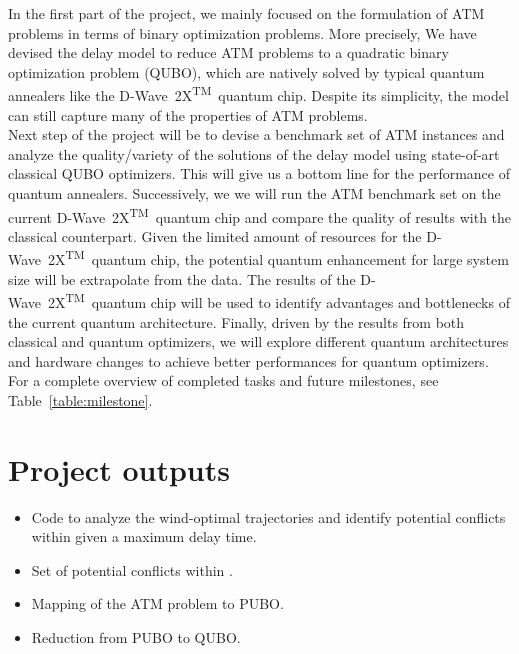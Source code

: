 \documentclass[9pt]{extarticle}
\renewcommand{\tablename}{Table}
\newcommand{\note}[1][]{\added[remark={#1}]}
\newcommand{\DW}{\mbox{D-Wave 2X\textsuperscript{TM}}~}
\begin{document}
In the first part of the project, we mainly focused on the formulation of ATM problems in terms of binary optimization problems. More precisely,
We have devised the delay model to reduce ATM problems to a quadratic binary optimization problem (QUBO), which are natively solved by typical 
quantum annealers like the \DW quantum chip. Despite its simplicity, the model can still capture many of the properties of ATM problems. \\

Next step of the project will be to devise a benchmark set of ATM instances and analyze the quality/variety of the solutions of the delay model using 
state-of-art classical QUBO optimizers. This will give us a bottom line for the performance of quantum annealers. Successively, we 
we will run the ATM benchmark set on the current \DW quantum chip and compare the quality of results with the classical counterpart. Given the limited
amount of resources for the \DW quantum chip, the potential quantum enhancement for large system size will
be extrapolate from the data. The results of the \DW quantum chip will be used to identify advantages and bottlenecks of
the current quantum architecture. Finally, driven by the results from both classical and quantum optimizers, 
we will explore different quantum architectures and hardware changes to achieve better performances for quantum optimizers.\\

For a complete overview of completed tasks and future milestones, see \tablename~\ref{table:milestone}.

\section*{Project outputs}

\begin{itemize}
	\item Code to analyze the wind-optimal trajectories and identify potential conflicts within given a maximum delay time.
	\item Set of potential conflicts within \note[Check]{1 hour of maximum delay}.
	\item Mapping of the ATM problem to PUBO.
	\item Reduction from PUBO to QUBO.
\end{itemize}
\end{document}
